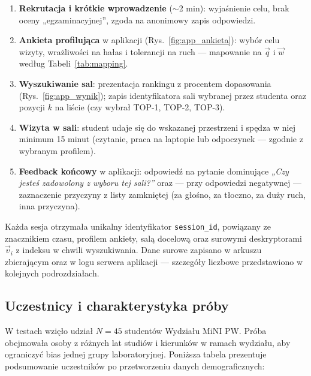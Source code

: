 \documentclass[14pt,a4paper]{extarticle}
\begin{document}
\begin{enumerate}
    \item \textbf{Rekrutacja i krótkie wprowadzenie} ($\sim$2 min): wyjaśnienie celu, brak oceny „egzaminacyjnej”, zgoda na anonimowy zapis odpowiedzi.
    \item \textbf{Ankieta profilująca} w aplikacji (Rys.~\ref{fig:app_ankieta}): wybór celu wizyty, wrażliwości na hałas i tolerancji na ruch --- mapowanie na $\vec{q}$ i $\vec{w}$ według Tabeli~\ref{tab:mapping}.
    \item \textbf{Wyszukiwanie sal}: prezentacja rankingu z procentem dopasowania (Rys.~\ref{fig:app_wynik}); zapis identyfikatora sali wybranej przez studenta oraz pozycji $k$ na liście (czy wybrał TOP-1, TOP-2, TOP-3).
    \item \textbf{Wizyta w sali}: student udaje się do wskazanej przestrzeni i spędza w niej minimum 15 minut (czytanie, praca na laptopie lub odpoczynek --- zgodnie z wybranym profilem).
    \item \textbf{Feedback końcowy} w aplikacji: odpowiedź na pytanie dominujące \emph{„Czy jesteś zadowolony z wyboru tej sali?”} oraz --- przy odpowiedzi negatywnej --- zaznaczenie przyczyny z listy zamkniętej (za głośno, za tłoczno, za duży ruch, inna przyczyna).
\end{enumerate}

Każda sesja otrzymała unikalny identyfikator \texttt{session\_id}, powiązany ze znacznikiem czasu, profilem ankiety, salą docelową oraz surowymi deskryptorami $\vec{v}_i$ z indeksu w chwili wyszukiwania. Dane surowe zapisano w arkuszu zbierającym oraz w logu serwera aplikacji --- szczegóły liczbowe przedstawiono w kolejnych podrozdziałach.

\subsection{Uczestnicy i charakterystyka próby}
W testach wzięło udział $N = 45$ studentów Wydziału MiNI PW. Próba obejmowała osoby z różnych lat studiów i kierunków w ramach wydziału, aby ograniczyć bias jednej grupy laboratoryjnej. Poniższa tabela prezentuje podsumowanie uczestników po przetworzeniu danych demograficznych:
\end{document}
